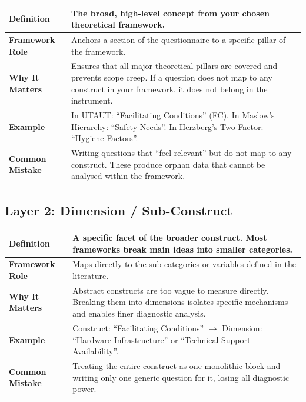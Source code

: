 \documentclass[12pt,a4paper]{article}
\begin{document}
\begin{table}[H]\centering\small
\begin{tabularx}{\textwidth}{L{3cm} X}
\toprule
\textbf{Definition} & The broad, high-level concept from your chosen theoretical framework. \\
\midrule
\textbf{Framework Role} & Anchors a section of the questionnaire to a specific pillar of the framework. \\
\midrule
\textbf{Why It Matters} & Ensures that all major theoretical pillars are covered and prevents scope creep. If a question does not map to any construct in your framework, it does not belong in the instrument. \\
\midrule
\textbf{Example} & In UTAUT: ``Facilitating Conditions'' (FC). In Maslow's Hierarchy: ``Safety Needs''. In Herzberg's Two-Factor: ``Hygiene Factors''. \\
\midrule
\textbf{Common Mistake} & Writing questions that ``feel relevant'' but do not map to any construct. These produce orphan data that cannot be analysed within the framework. \\
\bottomrule
\end{tabularx}
\end{table}

\subsection{Layer 2: Dimension / Sub-Construct}

\begin{table}[H]\centering\small
\begin{tabularx}{\textwidth}{L{3cm} X}
\toprule
\textbf{Definition} & A specific facet of the broader construct. Most frameworks break main ideas into smaller categories. \\
\midrule
\textbf{Framework Role} & Maps directly to the sub-categories or variables defined in the literature. \\
\midrule
\textbf{Why It Matters} & Abstract constructs are too vague to measure directly. Breaking them into dimensions isolates specific mechanisms and enables finer diagnostic analysis. \\
\midrule
\textbf{Example} & Construct: ``Facilitating Conditions'' $\rightarrow$ Dimension: ``Hardware Infrastructure'' or ``Technical Support Availability''. \\
\midrule
\textbf{Common Mistake} & Treating the entire construct as one monolithic block and writing only one generic question for it, losing all diagnostic power. \\
\bottomrule
\end{tabularx}
\end{table}
\end{document}
